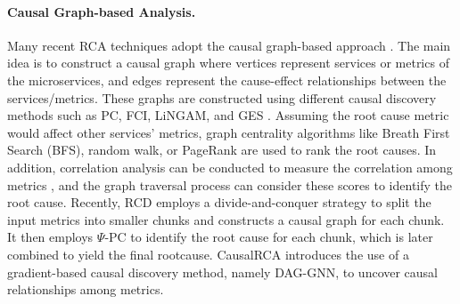 \vspace{-0.2cm}
\paragraph{Causal Graph-based Analysis.} 

Many recent RCA techniques adopt the causal graph-based approach \cite{Chen2014Causeinfer, chen2016causeinfer, Jinjin2018Microscope, Wang2018cloudranger, Chen2019airalert, Ma2019Msrank, Meng2020Microcause, Ma2020Automap, wu2021microdiag, Azam2022rcd, Xin2023CausalRCA}. The main idea is to construct a causal graph where vertices represent services or metrics of the microservices, and edges represent the cause-effect relationships between the services/metrics. These graphs are constructed using different causal discovery methods such as PC, FCI, LiNGAM, and GES \cite{Spirtes1993Causal, Spirtes1995fci, Chickering2002Ges, Shimizu2006Lingam, Jaber2020PsiFCI}. Assuming the root cause metric would affect other services' metrics, graph centrality algorithms like Breath First Search (BFS), random walk, or PageRank are used to rank the root causes. In addition, correlation analysis can be conducted to measure the correlation among metrics \cite{wu2021microdiag}, and the graph traversal process can consider these scores to identify the root cause. Recently, RCD \cite{Azam2022rcd} employs a divide-and-conquer strategy to split the input metrics into smaller chunks and constructs a causal graph for each chunk. It then employs $\Psi$-PC \cite{Jaber2020PsiFCI} to identify the root cause for each chunk, which is later combined to yield the final rootcause. CausalRCA \cite{Xin2023CausalRCA} introduces the use of a gradient-based causal discovery method, namely DAG-GNN, to uncover causal relationships among metrics.
